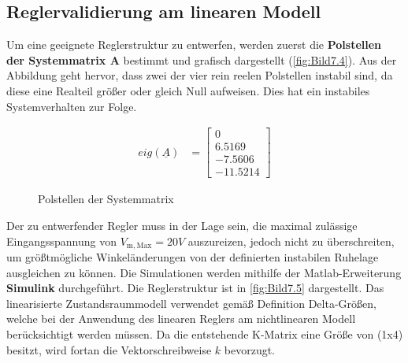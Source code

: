 \subsection{Reglervalidierung am linearen Modell}
\label{sec:Reglervalidierung}

Um eine geeignete Reglerstruktur zu entwerfen, werden zuerst die \textbf{Polstellen der Systemmatrix A} bestimmt und grafisch dargestellt (\autoref{fig:Bild7.4}). Aus der Abbildung geht hervor, dass zwei der vier rein reelen Polstellen instabil sind, da diese eine Realteil größer oder gleich Null aufweisen. Dies hat ein instabiles Systemverhalten zur Folge.

\begin{align*}
    eig(\underline{A}) &=
    \begin{bmatrix}
        0 \\
        6.5169 \\
        -7.5606 \\
        -11.5214
    \end{bmatrix}
\end{align*}

\begin{figure}[H]
   \centering
   \caption[Polstellen der Systemmatrix]{Polstellen der Systemmatrix}
   \label{fig:Bild7.4}
\end{figure}

Der zu entwerfender Regler muss in der Lage sein, die maximal zulässige Eingangsspannung von $V_{\mathrm{m,Max}} = 20V$ auszureizen, jedoch nicht zu überschreiten, um größtmögliche Winkeländerungen von der definierten instabilen Ruhelage ausgleichen zu können. Die Simulationen werden mithilfe der Matlab-Erweiterung \textbf{Simulink} durchgeführt. Die Reglerstruktur ist in \autoref{fig:Bild7.5} dargestellt. Das linearisierte Zustandsraummodell verwendet gemäß Definition Delta-Größen, welche bei der Anwendung des linearen Reglers am nichtlinearen Modell berücksichtigt werden müssen. Da die entstehende K-Matrix eine Größe von (1x4) besitzt, wird fortan die Vektorschreibweise $k$ bevorzugt.

